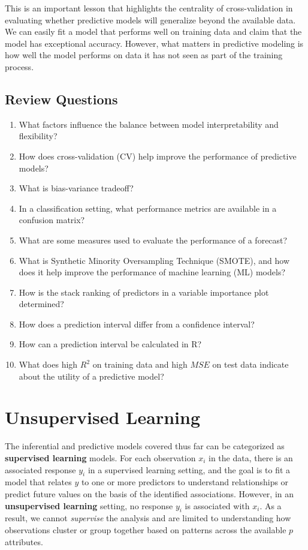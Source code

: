 \documentclass[
]{book}
\begin{document}
This is an important lesson that highlights the centrality of cross-validation in evaluating whether predictive models will generalize beyond the available data. We can easily fit a model that performs well on training data and claim that the model has exceptional accuracy. However, what matters in predictive modeling is how well the model performs on data it has not seen as part of the training process.

\hypertarget{review-questions-11}{%
\section{Review Questions}\label{review-questions-11}}

\begin{enumerate}
\def\labelenumi{\arabic{enumi}.}
\item
  What factors influence the balance between model interpretability and flexibility?
\item
  How does cross-validation (CV) help improve the performance of predictive models?
\item
  What is bias-variance tradeoff?
\item
  In a classification setting, what performance metrics are available in a confusion matrix?
\item
  What are some measures used to evaluate the performance of a forecast?
\item
  What is Synthetic Minority Oversampling Technique (SMOTE), and how does it help improve the performance of machine learning (ML) models?
\item
  How is the stack ranking of predictors in a variable importance plot determined?
\item
  How does a prediction interval differ from a confidence interval?
\item
  How can a prediction interval be calculated in R?
\item
  What does high \(R^2\) on training data and high \(MSE\) on test data indicate about the utility of a predictive model?
\end{enumerate}

\hypertarget{unsup-lrn}{%
\chapter{Unsupervised Learning}\label{unsup-lrn}}

The inferential and predictive models covered thus far can be categorized as \textbf{supervised learning} models. For each observation \(x_i\) in the data, there is an associated response \(y_i\) in a supervised learning setting, and the goal is to fit a model that relates \(y\) to one or more predictors to understand relationships or predict future values on the basis of the identified associations. However, in an \textbf{unsupervised learning} setting, no response \(y_i\) is associated with \(x_i\). As a result, we cannot \emph{supervise} the analysis and are limited to understanding how observations cluster or group together based on patterns across the available \(p\) attributes.
\end{document}
